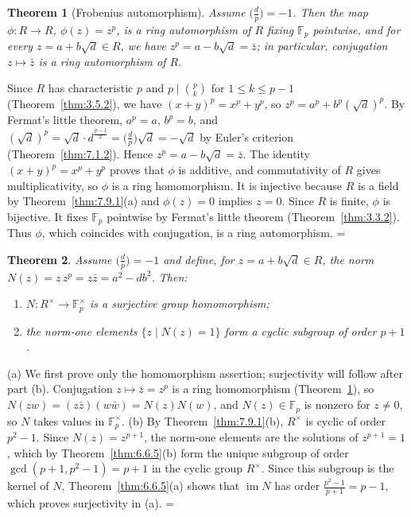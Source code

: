 \documentclass[11pt]{article}
\makeatletter
\let\nt@closedisplay\]
\def\nt@guardedclose{\@ifnextchar\par{\nt@closeafterpar}{\@ifnextchar\end{\postdisplaypenalty\@M\nt@closedisplay}{\nt@closedisplay}}}
\def\nt@closeafterpar\par{\@ifnextchar\par{\nt@closeafterpar}{\@ifnextchar\end{\postdisplaypenalty\@M\nt@closedisplay\par}{\nt@closedisplay\par}}}
\renewenvironment{proof}[1][\proofname]{\par
  \pushQED{\qed}\normalfont\topsep\medskipamount\edef\nt@afterproof{\@endparpenalty=\the\@endparpenalty\relax}\@beginparpenalty\@M\@endparpenalty\@M\let\]\nt@guardedclose\trivlist\item[]\textit{#1\@addpunct{.}} \ignorespaces}{\ifvmode\addpenalty\@M\fi\popQED\nt@afterproof\endtrivlist\@endpefalse}
\theoremstyle{ntstyle}
\newtheorem{theorem}{Theorem}[subsection]
\newcommand{\legs}[2]{\bigl(\tfrac{#1}{#2}\bigr)}
\makeatother
\begin{document}
\begin{theorem}[Frobenius automorphism]\label{thm:7.9.2}\label{thm:frobenius-automorphism}
  Assume
  $\legs{d}{p}=-1$. Then the map $\phi:R\to R$, $\phi(z)=z^{p}$, is a ring
  automorphism of $R$ fixing $\mathbb{F}_p$ pointwise, and for every
  $z = a + b\sqrt{d} \in R$, we have $z^p = a - b\sqrt{d} = \bar z$; in particular,
  conjugation $z\mapsto\bar z$ is a ring automorphism of $R$.

\end{theorem}

\begin{proof}
  Since $R$ has characteristic $p$ and $p \mid \binom{p}{k}$ for $1 \le k \le p-1$ (Theorem~\ref{thm:3.5.2}), we
  have $(x + y)^p = x^p + y^p$, so $z^p = a^p + b^p(\sqrt{d})^p$. By Fermat's little theorem, $a^p = a$, $b^p = b$,
  and $(\sqrt{d})^p = \sqrt{d} \cdot d^{\frac{p-1}{2}} = \legs{d}{p}\sqrt{d} = -\sqrt{d}$ by Euler's criterion
  (Theorem~\ref{thm:7.1.2}). Hence
  $z^p = a - b\sqrt{d} = \bar z$. The identity $(x+y)^p=x^p+y^p$ proves that
  $\phi$ is additive, and commutativity of $R$ gives multiplicativity, so $\phi$ is a ring
  homomorphism. It is injective because $R$ is a field by
  Theorem~\ref{thm:7.9.1}(a) and $\phi(z)=0$ implies $z=0$. Since $R$ is finite, $\phi$ is bijective.
  It fixes $\mathbb{F}_p$ pointwise by Fermat's little theorem
  (Theorem~\ref{thm:3.3.2}). Thus $\phi$, which coincides with conjugation, is a ring automorphism.
\end{proof}

\begin{theorem}\label{thm:7.9.3} Assume
  $\legs{d}{p}=-1$ and define, for $z = a + b\sqrt{d} \in R$,
  the norm $N(z) = z\, z^p = z\bar z = a^2 - d b^2$. Then:
  \begin{enumerate}[label={\alph*)}]
    \item $N : R^{\times} \to \mathbb{F}_p^{\times}$ is a surjective
          group homomorphism;
    \item the norm-one elements $\{z \mid N(z) = 1\}$ form a cyclic
          subgroup of order $p + 1$.
  \end{enumerate}

\end{theorem}

\begin{proof} (a) We first prove only the homomorphism
  assertion; surjectivity will follow after part (b). Conjugation
  $z\mapsto\bar z=z^p$ is a ring homomorphism (Theorem~\ref{thm:7.9.2}), so
  $N(zw) = (z\bar z)(w\bar w) = N(z)N(w)$, and $N(z) \in \mathbb{F}_p$ is nonzero for $z \neq 0$,
  so $N$ takes values in $\mathbb{F}_p^{\times}$. (b) By Theorem~\ref{thm:7.9.1}(b),
  $R^{\times}$ is cyclic of order $p^2-1$. Since $N(z)=z^{p+1}$, the norm-one elements
  are the solutions of $z^{p+1} = 1$, which by Theorem~\ref{thm:6.6.5}(b) form the unique subgroup of
  order $\gcd(p+1, p^2-1) = p+1$ in the cyclic group $R^{\times}$.
  Since this subgroup is the kernel of $N$, Theorem~\ref{thm:6.6.5}(a) shows that $\operatorname{im} N$ has order
  $\tfrac{p^2-1}{p+1} = p-1$, which proves surjectivity in (a).
\end{proof}
\end{document}
